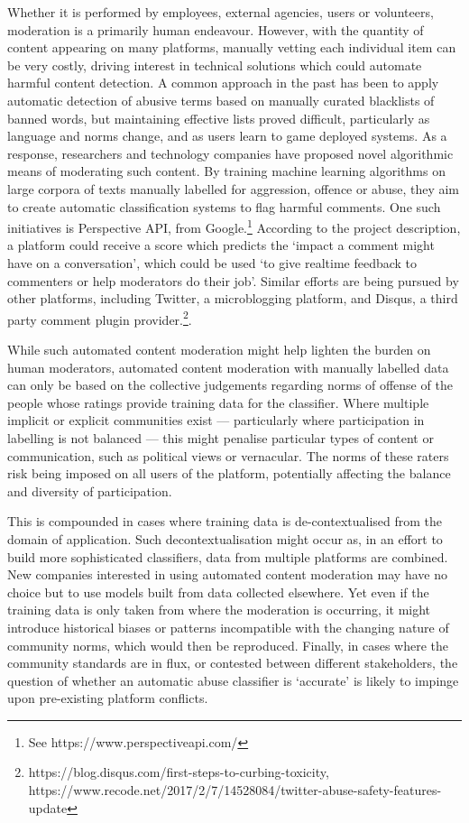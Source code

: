 \documentclass[runningheads,a4paper]{llncs}
\begin{document}
Whether it is performed by employees, external agencies, users or volunteers, moderation is a primarily human endeavour. However, with the quantity of content appearing on many platforms, manually vetting each individual item can be very costly, driving interest in technical solutions which could automate harmful content detection. A common approach in the past has been to apply automatic detection of abusive terms based on manually curated blacklists of banned words, but maintaining effective lists proved difficult, particularly as language and norms change, and as users learn to game deployed systems. As a response, researchers and technology companies have proposed novel algorithmic means of moderating such content. By training machine learning algorithms on large corpora of texts manually labelled for aggression, offence or abuse, they aim to create automatic classification systems to flag harmful comments. One such initiatives is Perspective API, from Google.\footnote{See https://www.perspectiveapi.com/} According to the project description, a platform could receive a score which predicts the ‘impact a comment might have on a conversation’, which could be used ‘to give realtime feedback to commenters or help moderators do their job’. Similar efforts are being pursued by other platforms, including Twitter, a microblogging platform, and Disqus, a third party comment plugin provider.\footnote{https://blog.disqus.com/first-steps-to-curbing-toxicity, https://www.recode.net/2017/2/7/14528084/twitter-abuse-safety-features-update}.
 
While such automated content moderation might help lighten the burden on human moderators, automated content moderation with manually labelled data can only be based on the collective judgements regarding norms of offense of the people whose ratings provide training data for the classifier. Where multiple implicit or explicit communities exist — particularly where participation in labelling is not balanced — this might penalise particular types of content or communication, such as political views or vernacular. The norms of these raters risk being imposed on all users of the platform, potentially affecting the balance and diversity of participation.

This is compounded in cases where training data is de-contextualised from the domain of application. Such decontextualisation might occur as, in an effort to build more sophisticated classifiers, data from multiple platforms are combined. New companies interested in using automated content moderation may have no choice but to use models built from data collected elsewhere. Yet even if the training data is only taken from where the moderation is occurring, it might introduce historical biases or patterns incompatible with the changing nature of community norms, which would then be reproduced. Finally, in cases where the community standards are in flux, or contested between different stakeholders, the question of whether an automatic abuse classifier is ‘accurate’ is likely to impinge upon pre-existing platform conflicts.
 
\end{document}
